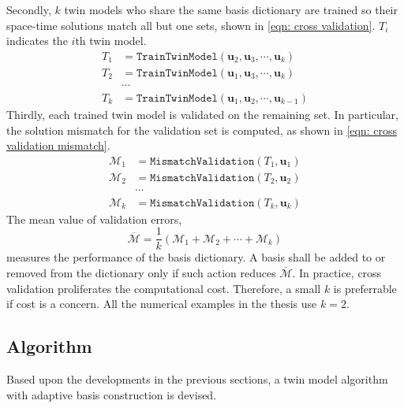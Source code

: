 Secondly, $k$ twin models who share the same basis dictionary 
are trained so their space-time solutions match
all but one sets, shown in \eqref{eqn: cross validation}.
$T_i$ indicates the $i$th twin model.
\begin{equation}\begin{split}
T_1 &= \texttt{TrainTwinModel}(\boldsymbol{u}_2, \boldsymbol{u}_3, \cdots, \boldsymbol{u}_k)\\
T_2 &= \texttt{TrainTwinModel}(\boldsymbol{u}_1, \boldsymbol{u}_3, \cdots, \boldsymbol{u}_k)\\
&\cdots\\
T_k &= \texttt{TrainTwinModel}(\boldsymbol{u}_1, \boldsymbol{u}_2, \cdots, \boldsymbol{u}_{k-1})
\label{eqn: cross validation}
\end{split}\end{equation}
Thirdly, each trained twin model is validated on the remaining set. In particular,
the solution mismatch for the validation set is computed, as shown in 
\eqref{eqn: cross validation mismatch}.
\begin{equation}\begin{split}
    \mathcal{M}_1 &= \texttt{MismatchValidation}\left( T_1 , \boldsymbol{u}_1\right)\\
    \mathcal{M}_2 &= \texttt{MismatchValidation}\left( T_2 , \boldsymbol{u}_2\right)\\
    &\cdots\\
    \mathcal{M}_k &= \texttt{MismatchValidation}\left( T_k , \boldsymbol{u}_k\right)
    \label{eqn: cross validation mismatch}
\end{split}\end{equation}
The mean value of validation errors,
\begin{equation}
    \overline{\mathcal{M}} = \frac{1}{k}\left(\mathcal{M}_1 + \mathcal{M}_2 + \cdots 
    + \mathcal{M}_k\right)
\end{equation}
measures the performance of the basis dictionary. A basis shall be added to or removed from
the dictionary only if such action reduces $\overline{\mathcal{M}}$. In practice, cross validation
proliferates the computational cost. 
Therefore, a small $k$ is preferrable if cost is a concern. 
All the numerical examples in the thesis use $k=2$.\\

\subsection{Algorithm}
\label{sec: twin algo}
Based upon the developments in the previous sections, a twin model algorithm 
with adaptive basis construction is devised.\\


